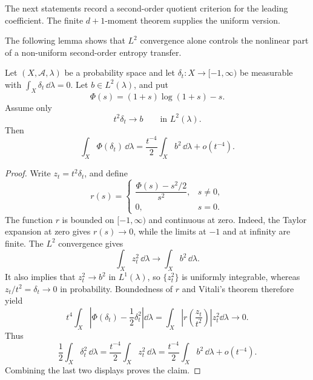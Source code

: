 The next statements record a second-order quotient criterion for the leading
coefficient.  The finite \(d+1\)-moment theorem supplies the uniform version.

\noindent The following lemma shows that \(L^2\) convergence alone controls
the nonlinear part of a non-uniform second-order entropy transfer.

\begin{lemma}%
\label{lem:l2-second-order-entropy-criterion}
Let \((X,\mathcal A,\lambda)\) be a probability space and let
\(\delta_t:X\to[-1,\infty)\) be measurable with
\(\int_X\delta_t\,\dd\lambda=0\).  Let \(b\in L^2(\lambda)\), and put
\[
  \Phi(s)=(1+s)\log(1+s)-s .
\]
Assume only
\[
  t^2\delta_t\longrightarrow b
  \qquad\text{in }L^2(\lambda).
\]
Then
\[
  \int_X\Phi(\delta_t)\,\dd\lambda
  =\frac{t^{-4}}2\int_X b^2\,\dd\lambda+o(t^{-4}).
\]
\end{lemma}

\begin{proof}
Write \(z_t=t^2\delta_t\), and define
\[
r(s)=
\begin{cases}
\dfrac{\Phi(s)-s^2/2}{s^2},&s\ne0,\\[4pt]
0,&s=0.
\end{cases}
\]
The function \(r\) is bounded on \([-1,\infty)\) and continuous at zero.
Indeed, the Taylor expansion at zero gives \(r(s)\to0\), while the limits at
\(-1\) and at infinity are finite.  The \(L^2\) convergence gives
\[
  \int_X z_t^2\,\dd\lambda\to\int_X b^2\,\dd\lambda .
\]
It also implies that \(z_t^2\to b^2\) in \(L^1(\lambda)\), so
\(\{z_t^2\}\) is uniformly integrable, whereas
\(z_t/t^2=\delta_t\to0\) in probability.  Boundedness of \(r\) and Vitali's
theorem therefore yield
\[
t^4\int_X\left|\Phi(\delta_t)-\frac12\delta_t^2\right|\dd\lambda
=\int_X\left|r\!\left(\frac{z_t}{t^2}\right)\right|z_t^2\dd\lambda
\longrightarrow0.
\]
Thus
\[
  \frac12\int_X\delta_t^2\,\dd\lambda
  =\frac{t^{-4}}2\int_Xz_t^2\,\dd\lambda
  =\frac{t^{-4}}2\int_Xb^2\,\dd\lambda+o(t^{-4}).
\]
Combining the last two displays proves the claim.
\end{proof}

\medskip

